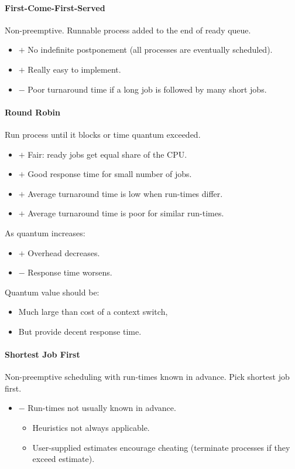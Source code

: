 \documentclass[twocolumn,english]{article}
\begin{document}
\paragraph{First-Come-First-Served}

Non-preemptive. Runnable process added to the end of ready queue.
\begin{itemize}
\item $+$ No indefinite postponement (all processes are eventually scheduled).
\item $+$ Really easy to implement.
\item $-$ Poor turnaround time if a long job is followed by many short
jobs.
\end{itemize}

\paragraph{Round Robin}

Run process until it blocks or time quantum exceeded.
\begin{itemize}
\item $+$ Fair: ready jobs get equal share of the CPU.
\item $+$ Good response time for small number of jobs.
\item $+$ Average turnaround time is low when run-times differ.
\item $+$ Average turnaround time is poor for similar run-times.
\end{itemize}
As quantum increases:
\begin{itemize}
\item $+$ Overhead decreases.
\item $-$ Response time worsens.
\end{itemize}
Quantum value should be:
\begin{itemize}
\item Much large than cost of a context switch,
\item But provide decent response time.
\end{itemize}

\paragraph{Shortest Job First}

Non-preemptive scheduling with run-times known in advance. Pick shortest
job first.
\begin{itemize}
\item $-$ Run-times not usually known in advance.
\begin{itemize}
\item Heuristics not always applicable.
\item User-supplied estimates encourage cheating (terminate processes if
they exceed estimate).
\end{itemize}
\end{itemize}
\end{document}
